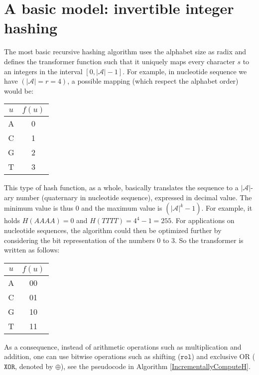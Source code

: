 \documentclass[11pt,a4paper]{scrartcl}
\newcommand{\XOR}[0]{\mathtt{XOR}}
\newcommand{\rol}[0]{\mathtt{rol}}
\begin{document}
\section{A basic model: invertible integer hashing}
The most basic recursive hashing algorithm uses the alphabet size as
radix and defines the transformer function such that it uniquely
maps every character $s$ to an integers in the interval
$[0,|\mathcal{A}|-1]$. For example, in nucleotide sequence we have
$(|\mathcal{A}|=r=4)$,
a possible mapping (which respect the alphabet order) would be:
\begin{center}
\begin{tabular}{c|c}
$u$ & $f(u)$\\
\hline
A & 0 \\
C & 1 \\
G & 2\\
T & 3
\end{tabular}
\end{center}
This type of hash function, as a whole, basically translates the sequence
to a $|\mathcal{A}|$-ary number (quaternary in nucleotide sequence),
expressed in
decimal value. The minimum value is thus 0 and the maximum value is
$(|\mathcal{A}|^k-1)$. For example, it holds $H(AAAA) = 0$ and
$H(TTTT) = 4^4-1 = 255$.
For applications on nucleotide sequences,
the algorithm could then be optimized further by considering the bit
representation of the numbers 0 to 3. So the transformer is written as
follows:
\begin{center}
\begin{tabular}{c|c}
$u$ & $f(u)$ \\
\hline
A & 00\\
C & 01\\
G & 10\\
T & 11
\end{tabular}
\end{center}
As a consequence, instead of
arithmetic operations such as multiplication and addition, one can
use bitwise operations such as shifting ($\rol$) and exclusive OR (\(\XOR\),
denoted by
$\oplus$), see the pseudocode in Algorithm \ref{IncrementallyComputeH}.
\end{document}
